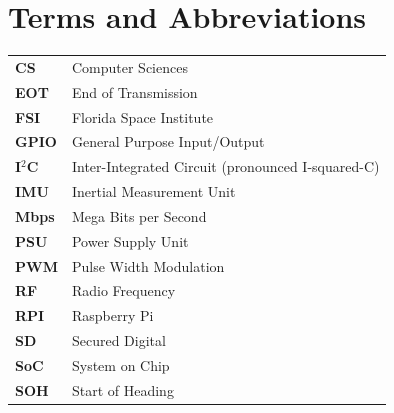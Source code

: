 \newpage

\tableofcontents

\newpage

\listoffigures

\newpage

\listoftables


\newpage
\section*{Terms and Abbreviations}

\begin{table}[H]
\raggedright
{}
\begin{tabular}{>{\bfseries}L{2cm}L{13.65cm}}
CS  	& Computer Sciences		  							\\
EOT     & End of Transmission                               \\
FSI  	& Florida Space Institute		  					\\
GPIO    & General Purpose Input/Output                      \\
I$^2$C  & Inter-Integrated Circuit (pronounced I-squared-C) \\
IMU     & Inertial Measurement Unit                         \\
Mbps    & Mega Bits per Second                              \\
PSU     & Power Supply Unit                                 \\
PWM     & Pulse Width Modulation                            \\
RF      & Radio Frequency                                   \\
RPI     & Raspberry Pi                                      \\
SD      & Secured Digital                                   \\
SoC     & System on Chip                                    \\
SOH     & Start of Heading                                  \\
\end{tabular}
\end{table}

